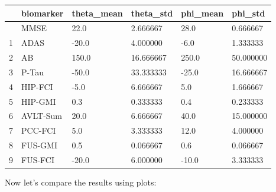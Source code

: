 \documentclass[
  letterpaper,
  DIV=11,
  numbers=noendperiod]{scrreprt}
\begin{document}
\begin{longtable}[]{@{}llllll@{}}
\toprule\noalign{}
& biomarker & theta\_mean & theta\_std & phi\_mean & phi\_std \\
\midrule\noalign{}
\endhead
\bottomrule\noalign{}
\endlastfoot
0 & MMSE & 22.0 & 2.666667 & 28.0 & 0.666667 \\
1 & ADAS & -20.0 & 4.000000 & -6.0 & 1.333333 \\
2 & AB & 150.0 & 16.666667 & 250.0 & 50.000000 \\
3 & P-Tau & -50.0 & 33.333333 & -25.0 & 16.666667 \\
4 & HIP-FCI & -5.0 & 6.666667 & 5.0 & 1.666667 \\
5 & HIP-GMI & 0.3 & 0.333333 & 0.4 & 0.233333 \\
6 & AVLT-Sum & 20.0 & 6.666667 & 40.0 & 15.000000 \\
7 & PCC-FCI & 5.0 & 3.333333 & 12.0 & 4.000000 \\
8 & FUS-GMI & 0.5 & 0.066667 & 0.6 & 0.066667 \\
9 & FUS-FCI & -20.0 & 6.000000 & -10.0 & 3.333333 \\
\end{longtable}

Now let's compare the results using plots:
\end{document}
